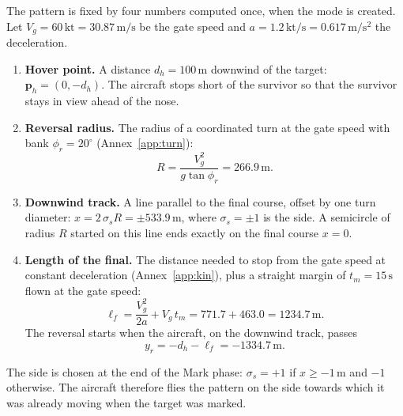 \documentclass[11pt,a4paper]{article}
\newcommand{\un}[1]{\,\mathrm{#1}}
\begin{document}
The pattern is fixed by four numbers computed once, when the mode is created.
Let $V_g=60\un{kt}=30.87\un{m/s}$ be the gate speed and
$a=1.2\un{kt/s}=0.617\un{m/s^2}$ the deceleration.

\begin{enumerate}
\item \textbf{Hover point.} A distance $d_h=100\un{m}$ downwind of the target:
$\mathbf{p}_h=(0,-d_h)$. The aircraft stops short of the survivor so that the
survivor stays in view ahead of the nose.
\item \textbf{Reversal radius.} The radius of a coordinated turn at the gate
speed with bank $\phi_r=20^\circ$ (Annex~\ref{app:turn}):
\begin{equation}
R = \frac{V_g^2}{g\tan\phi_r} = 266.9\un{m}.
\end{equation}
\item \textbf{Downwind track.} A line parallel to the final course, offset by
one turn diameter: $x = 2\,\sigma_s R = \pm533.9\un{m}$, where
$\sigma_s=\pm1$ is the side. A semicircle of radius $R$ started on this line
ends exactly on the final course $x=0$.
\item \textbf{Length of the final.} The distance needed to stop from the gate
speed at constant deceleration (Annex~\ref{app:kin}), plus a straight margin
of $t_m=15\un{s}$ flown at the gate speed:
\begin{equation}
\ell_f = \frac{V_g^2}{2a} + V_g\,t_m = 771.7 + 463.0 = 1234.7\un{m}.
\end{equation}
The reversal starts when the aircraft, on the downwind track, passes
\begin{equation}
y_r = -d_h - \ell_f = -1334.7\un{m}.
\end{equation}
\end{enumerate}

The side is chosen at the end of the Mark phase: $\sigma_s=+1$ if $x\ge-1\un{m}$
and $-1$ otherwise. The aircraft therefore flies the pattern on the side
towards which it was already moving when the target was marked.
\end{document}
